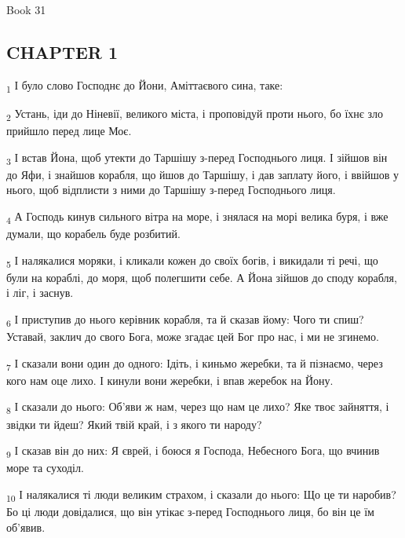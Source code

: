 Book 31
\subsection{CHAPTER 1}
\begin{tcolorbox}
\textsubscript{1} І було слово Господнє до Йони, Аміттаєвого сина, таке:
\end{tcolorbox}
\begin{tcolorbox}
\textsubscript{2} Устань, іди до Ніневії, великого міста, і проповідуй проти нього, бо їхнє зло прийшло перед лице Моє.
\end{tcolorbox}
\begin{tcolorbox}
\textsubscript{3} І встав Йона, щоб утекти до Таршішу з-перед Господнього лиця. І зійшов він до Яфи, і знайшов корабля, що йшов до Таршішу, і дав заплату його, і ввійшов у нього, щоб відплисти з ними до Таршішу з-перед Господнього лиця.
\end{tcolorbox}
\begin{tcolorbox}
\textsubscript{4} А Господь кинув сильного вітра на море, і знялася на морі велика буря, і вже думали, що корабель буде розбитий.
\end{tcolorbox}
\begin{tcolorbox}
\textsubscript{5} І налякалися моряки, і кликали кожен до своїх богів, і викидали ті речі, що були на кораблі, до моря, щоб полегшити себе. А Йона зійшов до споду корабля, і ліг, і заснув.
\end{tcolorbox}
\begin{tcolorbox}
\textsubscript{6} І приступив до нього керівник корабля, та й сказав йому: Чого ти спиш? Уставай, заклич до свого Бога, може згадає цей Бог про нас, і ми не згинемо.
\end{tcolorbox}
\begin{tcolorbox}
\textsubscript{7} І сказали вони один до одного: Ідіть, і киньмо жеребки, та й пізнаємо, через кого нам оце лихо. І кинули вони жеребки, і впав жеребок на Йону.
\end{tcolorbox}
\begin{tcolorbox}
\textsubscript{8} І сказали до нього: Об'яви ж нам, через що нам це лихо? Яке твоє зайняття, і звідки ти йдеш? Який твій край, і з якого ти народу?
\end{tcolorbox}
\begin{tcolorbox}
\textsubscript{9} І сказав він до них: Я єврей, і боюся я Господа, Небесного Бога, що вчинив море та суходіл.
\end{tcolorbox}
\begin{tcolorbox}
\textsubscript{10} І налякалися ті люди великим страхом, і сказали до нього: Що це ти наробив? Бо ці люди довідалися, що він утікає з-перед Господнього лиця, бо він це їм об'явив.
\end{tcolorbox}
